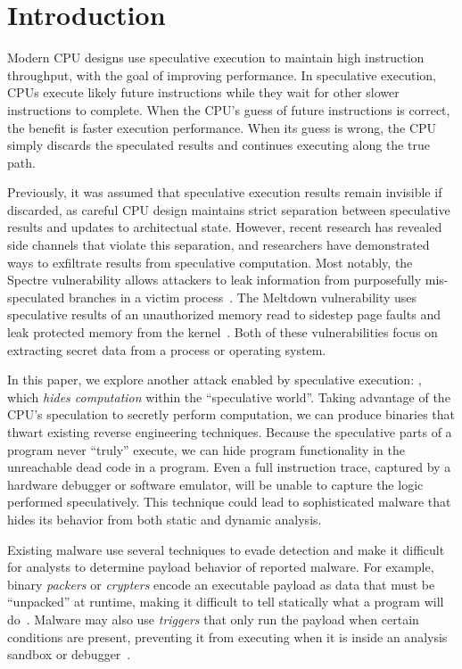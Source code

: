 
\section{Introduction}


Modern CPU designs use speculative execution to maintain high instruction
throughput, with the goal of improving performance. In speculative execution,
CPUs execute likely future instructions while they wait for other slower
instructions to complete. When the CPU's guess of future instructions is correct, the
benefit is faster execution performance. When its guess is wrong, the CPU
simply discards the speculated results and continues executing along the true path.


Previously, it was assumed that speculative execution results
remain invisible if discarded, as careful CPU design maintains strict separation
between speculative results and updates to architectual state.
However, recent research has revealed side channels that violate this
separation, and researchers have demonstrated ways to exfiltrate results from speculative
computation. Most notably, the Spectre vulnerability allows attackers to leak
information from purposefully mis-speculated branches in a victim
process~\cite{spectre}. The Meltdown vulnerability uses speculative results of an
unauthorized memory read to sidestep page faults and leak protected memory from
the kernel~\cite{meltdown}. Both of these vulnerabilities focus on extracting
secret data from a process or operating system.

\medskip

In this paper, we explore another attack enabled by speculative execution:
\speculake, which \emph{hides computation} within
the ``speculative world''. Taking advantage of the CPU's speculation to secretly
perform computation,
we can produce binaries that thwart existing reverse engineering
techniques. Because the speculative parts of a program never ``truly'' execute,
we can hide program functionality in the unreachable dead code in a program.
Even a full instruction trace, captured by a hardware debugger or software
emulator, will be unable to capture the logic performed speculatively.
This technique could lead to sophisticated malware that hides its behavior
from both static and dynamic analysis.


Existing malware use several techniques to evade detection and
make it difficult for analysts to determine payload behavior of reported malware. 
For example, binary \emph{packers} or \emph{crypters} encode an executable payload as
data that must be ``unpacked'' at runtime, making it difficult to tell
statically what a program will do~\cite{malware-packers}. Malware may also use
\emph{triggers} that only run the payload when certain conditions are present, preventing
it from executing when it is inside an analysis sandbox or 
debugger~\cite{balzarotti2010efficient,red-pill}.

